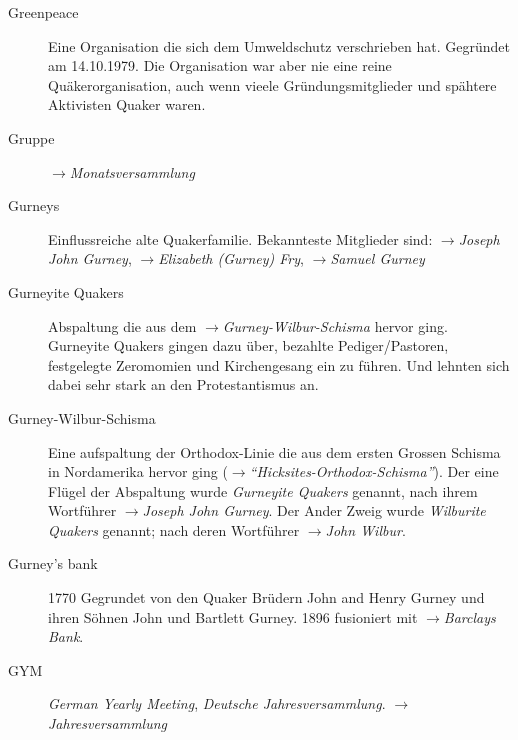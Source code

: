 \begin{description}
 \item[Greenpeace] Eine Organisation die sich dem Umweldschutz verschrieben hat.
 Gegründet am 14.10.1979. Die Organisation war aber nie eine reine
 Quäkerorganisation, auch wenn vieele Gründungsmitglieder und spähtere Aktivisten
 Quaker waren.

\item[Gruppe] $\to$\textit{Monatsversammlung}

\item[Gurneys] Einflussreiche alte Quakerfamilie. Bekannteste Mitglieder sind:
$\to$\textit{Joseph John Gurney}, $\to$\textit{Elizabeth (Gurney) Fry},
$\to$\textit{Samuel Gurney}


\item[Gurneyite Quakers] Abspaltung die aus dem $\to$\textit{Gurney-Wilbur-Schisma}
hervor ging. Gurneyite Quakers gingen dazu über, bezahlte Pediger/Pastoren,
festgelegte Zeromomien und Kirchengesang ein zu führen. Und lehnten sich dabei
sehr stark an den Protestantismus an.

\item[Gurney-Wilbur-Schisma]
Eine aufspaltung der Orthodox-Linie die aus dem ersten Grossen Schisma in
Nordamerika hervor ging ($\to$\textit{"`Hicksites-Orthodox-Schisma"'}). Der
eine Flügel der Abspaltung wurde \textit{Gurneyite Quakers} genannt, nach
ihrem Wortführer $\to$\textit{Joseph John Gurney}. Der Ander Zweig wurde
\textit{Wilburite Quakers} genannt; nach deren Wortführer
$\to$\textit{John Wilbur}.


\item[Gurney's bank] 1770 Gegrundet von den Quaker Brüdern John and Henry Gurney und
ihren Söhnen John und Bartlett Gurney. 1896 fusioniert mit
$\to$\textit{Barclays Bank}.

\item[GYM] \textit{German Yearly Meeting}, \textit{Deutsche Jahresversammlung}. $\to$\textit{Jahresversammlung}
 \end{description}

\normalsize